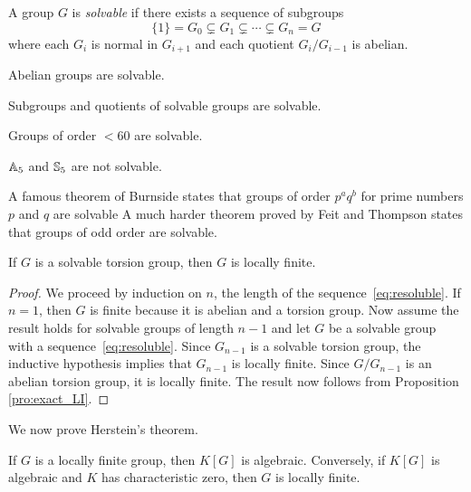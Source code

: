 A group $G$ is
\emph{solvable} if there exists a sequence
of subgroups 
\begin{equation}
	\label{eq:resoluble}
	\{1\}=G_0\subsetneq G_1\subsetneq \cdots\subsetneq G_n=G
\end{equation}
where each $G_i$ is normal in $G_{i+1}$ and each 
quotient $G_i/G_{i-1}$ is
abelian.

\begin{example}
    Abelian groups are solvable. 
\end{example}

Subgroups and quotients of solvable groups are solvable. 

\begin{example}
    Groups of order $<60$ are solvable.
\end{example}

\begin{example}
    $\mathbb{A}_5$ and $\mathbb{S}_5$ are not solvable. 
\end{example}

A famous theorem of Burnside states that 
groups of order $p^aq^b$ for prime numbers $p$ and $q$ are solvable 
A much harder theorem proved by Feit and Thompson states that
groups of odd order are solvable.

\begin{proposition}
	If $G$ is a solvable torsion group, 
	then $G$ is locally finite. 
\end{proposition}

\begin{proof}
	We proceed by induction on $n$, the length of the sequence~\eqref{eq:resoluble}. 
	If $n=1$, then $G$ is finite because it is abelian and a torsion group.
	Now assume the result holds for solvable groups of length $n-1$ and let
	$G$ be a solvable group with a sequence~\eqref{eq:resoluble}. Since $G_{n-1}$ is 
	a solvable torsion group, the inductive hypothesis implies that 
	$G_{n-1}$ is locally finite. Since $G/G_{n-1}$ is an abelian torsion group, 
	it is locally finite. The result now follows from Proposition \ref{pro:exact_LI}.
\end{proof}

We now prove Herstein's theorem.

\begin{theorem}[Herstein]
	If $G$ is a locally finite group, then $K[G]$ is algebraic. Conversely, if 
	$K[G]$ is algebraic and $K$ has characteristic zero, then $G$ 
	is locally finite. 
\end{theorem}

